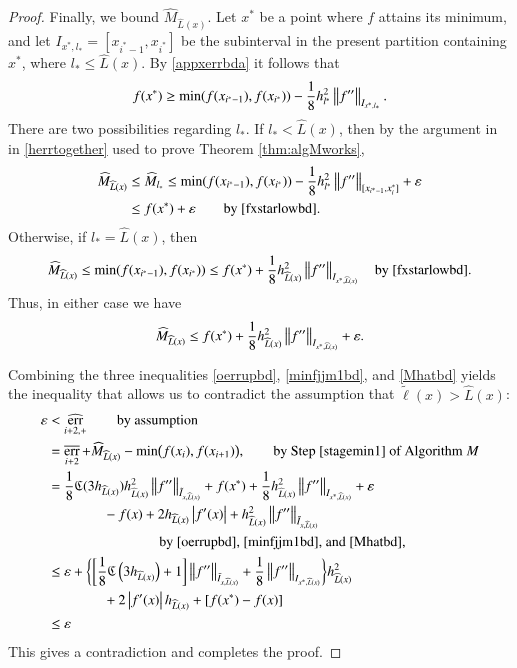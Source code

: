 \documentclass[review]{elsarticle}
\newcommand{\abstol}{\varepsilon}
\theoremstyle{definition}
\newcommand{\tell}{\tilde{\ell}}
\newcommand{\chL}{\widehat{L}}
\newcommand{\hM}{\widehat{M}}
\DeclareMathOperator{\oerr}{\overline{err}}
\DeclareMathOperator{\herr}{\widehat{err}}
\begin{document}
\begin{proof}
Finally, we bound $ \hM_{\chL(x)}$. Let $x^*$ be a point where $f$ attains its minimum,
and
let $I_{x^*,l_*} = [x_{i^*-1}, x_{i^*}]$ be the subinterval in the present partition containing
$x^*$, where $l_* \le \chL(x)$. By
\eqref{appxerrbda} it follows that
\begin{equation} \label{fxstarlowbd}
f(x^*) \ge \min(f(x_{i^*-1}),f(x_{i^*})) - \frac18 h_{l^*}^2\norm[I_{x^*,l_*}]{f''}.
\end{equation}
There are two possibilities regarding $l_*$. If $l_* < \chL(x)$, then by the argument in  in
\eqref{herrtogether} used to prove Theorem \ref{thm:algMworks},
\begin{align*}
\hM_{\chL(x)}   & \le \hM_{l_*}
\le \min(f(x_{i^*-1}),f(x_{i^*})) - \frac18 h_{l^*}^2 \norm[{[x_{i^*-1}, x^*_i]}]{f''}  + \abstol  \\
& \le  f(x^*) + \abstol \qquad \text{by}~\eqref{fxstarlowbd} .
\end{align*}
Otherwise, if $l_* = \chL(x)$, then
\begin{equation*}
\hM_{\chL(x)}   \le \min(f(x_{i^*-1}),f(x_{i^*}))  \le  f(x^*) + \frac18 h_{\chL(x)}^2
\norm[{I_{x^*,\chL(x)}}]{f''} \quad \text{by}~\eqref{fxstarlowbd} .
\end{equation*}
Thus, in either case we have
\begin{equation} \label{Mhatbd}
\hM_{\chL(x)} \le f(x^*) + \frac 18 h_{\chL(x)}^2  \norm[{I_{x^*,\chL(x)}}]{f''} + \abstol.
\end{equation}

Combining the three inequalities \eqref{oerrupbd}, \eqref{minfjjm1bd}, and
\eqref{Mhatbd} yields the inequality that allows us to contradict the assumption
that $\tell(x) > \chL(x)$:
\begin{align*}
\abstol & < \herr_{i+2,+} \qquad \text{by assumption} \\
& = \oerr_{i+2} + \hM_{\chL(x)} - \min\bigl(f(x_{i}),f(x_{i+1})\bigr), \qquad \text{by Step
\ref{stagemin1} of Algorithm $M$} \\
& = \frac{1}{8} \fC(3 h_{\chL(x)}) h_{\chL(x)}^2 \norm[\tilde{I}_{x,\chL(x)}]{f''} + f(x^*) +
\frac 18 h_{\chL(x)}^2  \norm[{I_{x^*,\chL(x)}}]{f''} + \abstol \\
& \qquad \qquad - f(x) + 2h_{\chL(x)}\abs{f'(x)} + h_{\chL(x)}^2
\norm[\bar{I}_{x,\chL(x)}]{f''} \\
&  \qquad \qquad \qquad  \qquad \text{by \eqref{oerrupbd}, \eqref{minfjjm1bd}, and
\eqref{Mhatbd},} \\
& \le \abstol + \biggl\{ \biggl[\frac 18 \fC\left(3 h_{\chL(x)} \right) + 1 \biggr]
\norm[\tilde{I}_{x,\chL(x)}]{f''} + \frac18\norm[{I_{x^*,\chL(x)}}]{f''} \biggr\} h_{\chL(x)}^2 \\
& \qquad \qquad +  2 \abs{f'(x)} h_{\chL(x)} + [f(x^*) - f(x)] \\
& \le \abstol
\end{align*}
This gives a contradiction and completes the proof.
\end{proof}
\end{document}
